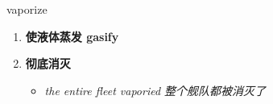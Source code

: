 
\begin{frame}
{\huge vaporize}
\begin{center}
\begin{enumerate}\Large
  \item \textbf{使液体蒸发 gasify}
  \item \textbf{彻底消灭}
  \begin{itemize}
    \item \em{\Large{the entire fleet vaporied 整个舰队都被消灭了}}
  \end{itemize}
\end{enumerate}
\end{center}
\end{frame}
